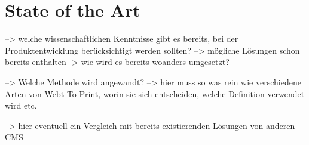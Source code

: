 \chapter{State of the Art}
--> welche wissenschaftlichen Kenntnisse gibt es bereits, bei der Produktentwicklung berücksichtigt werden sollten?
    --> mögliche Lösungen schon bereits enthalten -> wie wird es bereits woanders umgesetzt?

--> Welche Methode wird angewandt?
    --> hier muss so was rein wie verschiedene Arten von Webt-To-Print, worin sie sich entscheiden, welche Definition verwendet wird etc.

--> hier eventuell ein Vergleich mit bereits existierenden Lösungen von anderen CMS
